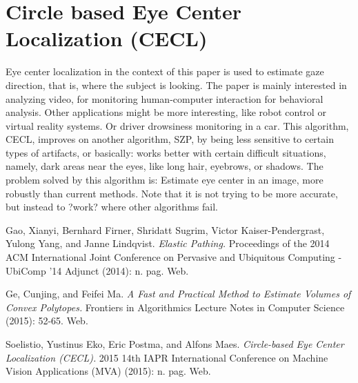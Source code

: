 \documentclass[11pt]{article}
\begin{document}
\section{Circle based Eye Center Localization (CECL)\cite{Soelistio}}
Eye center localization in the context of this paper is used to estimate gaze direction, that is, where the subject is looking. The paper is mainly interested in analyzing video, for monitoring human-computer interaction for behavioral analysis. Other applications might be more interesting, like robot control or virtual reality systems. Or driver drowsiness monitoring in a car.
This algorithm, CECL, improves on another algorithm, SZP, by being less sensitive to certain types of artifacts, or basically: works better with certain difficult situations, namely, dark areas near the eyes, like long hair, eyebrows, or shadows.
The problem solved by this algorithm is:  Estimate eye center in an image, more robustly than current methods.  Note that it is not trying to be more accurate, but instead to ?work? where other algorithms fail.

\begin{thebibliography}{10}
  Gao, Xianyi, Bernhard Firner, Shridatt Sugrim, Victor Kaiser-Pendergrast, Yulong Yang, and Janne Lindqvist. {\em Elastic Pathing.} Proceedings of the 2014 ACM International Joint Conference on Pervasive and Ubiquitous Computing - UbiComp '14 Adjunct (2014): n. pag. Web.


 Ge, Cunjing, and Feifei Ma. {\em A Fast and Practical Method to Estimate Volumes of Convex Polytopes.} Frontiers in Algorithmics Lecture Notes in Computer Science (2015): 52-65. Web.


 Soelistio, Yustinus Eko, Eric Postma, and Alfons Maes. {\em Circle-based Eye Center Localization (CECL).} 2015 14th IAPR International Conference on Machine Vision Applications (MVA) (2015): n. pag. Web.
\end{thebibliography}
\end{document}
